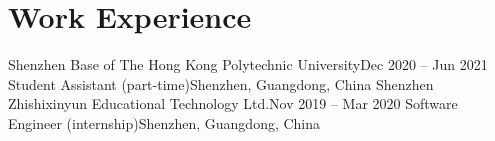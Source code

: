 \documentclass[letterpaper,11pt]{article}
\begin{document}
    \section{Work Experience}

    \resumeSubHeadingListStart
        \resumeSubheading
            {Shenzhen Base of The Hong Kong Polytechnic University}{Dec 2020 -- Jun 2021}
            {Student Assistant (part-time)}{Shenzhen, Guangdong, China}
        \resumeSubheading
            {Shenzhen Zhishixinyun Educational Technology Ltd.}{Nov 2019 -- Mar 2020}
            {Software Engineer (internship)}{Shenzhen, Guangdong, China}
    \resumeSubHeadingListEnd
\end{document}
